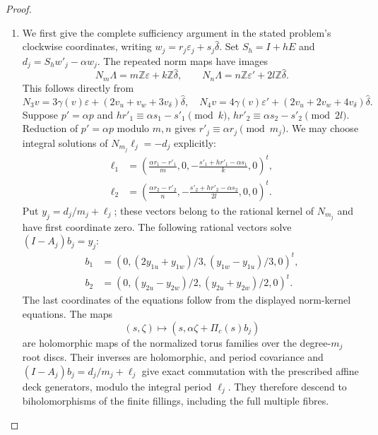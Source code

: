 \begin{proof}
\begin{enumerate}[label=\arabic*.,leftmargin=*]
\item We first give the complete sufficiency argument in the stated problem's
clockwise coordinates, writing $w_j=r_j\varepsilon_j+s_j\widehat\delta$.
Set $S_h=I+hE$ and $d_j=S_hw'_j-\alpha w_j$.
The repeated norm maps have images
\[
 N_m\Lambda=m\mathbb Z\varepsilon+k\mathbb Z\widehat\delta,
 \qquad
 N_n\Lambda=n\mathbb Z\varepsilon'+2l\mathbb Z\widehat\delta.
\]
This follows directly from
\[
 N_3v=3\gamma(v)\varepsilon+(2v_u+v_w+3v_\delta)\widehat\delta,
 \quad
 N_4v=4\gamma(v)\varepsilon'+(2v_u+2v_w+4v_\delta)\widehat\delta.
\]
Suppose $p'=\alpha p$ and
$hr'_1\equiv\alpha s_1-s'_1\pmod k$,
$hr'_2\equiv\alpha s_2-s'_2\pmod{2l}$.
Reduction of $p'=\alpha p$ modulo $m,n$ gives
$r'_j\equiv\alpha r_j\pmod{m_j}$.
We may choose integral solutions of $N_{m_j}\ell_j=-d_j$ explicitly:
\[
 \begin{split}
 \ell_1&=\left(\frac{\alpha r_1-r'_1}{m},0,
 -\frac{s'_1+hr'_1-\alpha s_1}{k},0\right)^t,\\
 \ell_2&=\left(\frac{\alpha r_2-r'_2}{n},
 -\frac{s'_2+hr'_2-\alpha s_2}{2l},0,0\right)^t.
 \end{split}
\]
Put $y_j=d_j/m_j+\ell_j$; these vectors belong to the rational
kernel of $N_{m_j}$ and have first coordinate zero.
The following rational vectors solve $(I-A_j)b_j=y_j$:
\[
 \begin{split}
 b_1&=(0,(2y_{1u}+y_{1w})/3,(y_{1w}-y_{1u})/3,0)^t,\\
 b_2&=(0,(y_{2u}-y_{2w})/2,(y_{2u}+y_{2w})/2,0)^t.
 \end{split}
\]
The last coordinates of the equations follow from the displayed
norm-kernel equations.  The maps
\[
 (s,\zeta)\longmapsto(s,\alpha\zeta+\Pi_c(s)b_j)
\]
are holomorphic maps of the normalized torus families over the
degree-$m_j$ root discs.  Their inverses are holomorphic, and period
covariance and $(I-A_j)b_j=d_j/m_j+\ell_j$ give exact commutation
with the prescribed affine deck generators, modulo the integral
period $\ell_j$.  They therefore descend to biholomorphisms of the
finite fillings, including the full multiple fibres.


\end{enumerate}
\end{proof}
